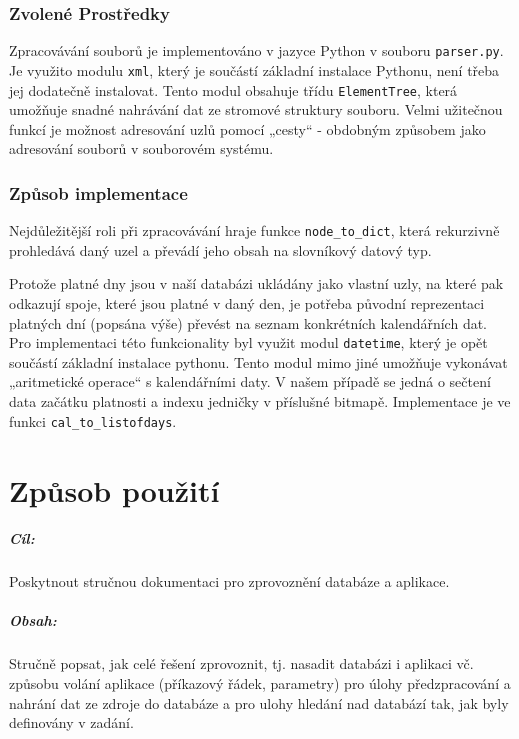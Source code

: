 \documentclass[10pt,xcolor=pdflatex,dvipsnames,table,oneside]{book}
\begin{document}
\subsection{Zvolené Prostředky}
Zpracovávání souborů je implementováno v jazyce Python v souboru \verb|parser.py|. Je využito modulu \verb|xml|, který je součástí základní instalace Pythonu, není třeba jej dodatečně instalovat. Tento modul obsahuje třídu \verb|ElementTree|, která umožňuje snadné nahrávání dat ze stromové struktury souboru. Velmi užitečnou funkcí je možnost adresování uzlů pomocí „cesty“ - obdobným způsobem jako adresování souborů v souborovém systému.

\subsection{Způsob implementace}
Nejdůležitější roli při zpracovávání hraje funkce \verb|node_to_dict|, která rekurzivně prohledává daný uzel a převádí jeho obsah na slovníkový datový typ.

Protože platné dny jsou v naší databázi ukládány jako vlastní uzly, na které pak odkazují spoje, které jsou platné v daný den, je potřeba původní reprezentaci platných dní (popsána výše) převést na seznam konkrétních kalendářních dat. Pro implementaci této funkcionality byl využit modul \verb|datetime|, který je opět součástí základní instalace pythonu. Tento modul mimo jiné umožňuje vykonávat „aritmetické operace“ s kalendářními daty. V našem případě se jedná o sečtení data začátku platnosti a indexu jedničky v příslušné bitmapě. Implementace je ve funkci \verb|cal_to_listofdays|.

\chapter{Způsob použití}

\paragraph{Cíl:}
Poskytnout stručnou dokumentaci pro zprovoznění databáze a aplikace.

\paragraph{Obsah:}
Stručně popsat, jak celé řešení zprovoznit, tj. nasadit databázi i aplikaci vč. způsobu volání aplikace (příkazový řádek, parametry) pro úlohy
předzpracování a nahrání dat ze zdroje do databáze a pro ulohy hledání nad databází tak, jak byly definovány v zadání.
\end{document}
